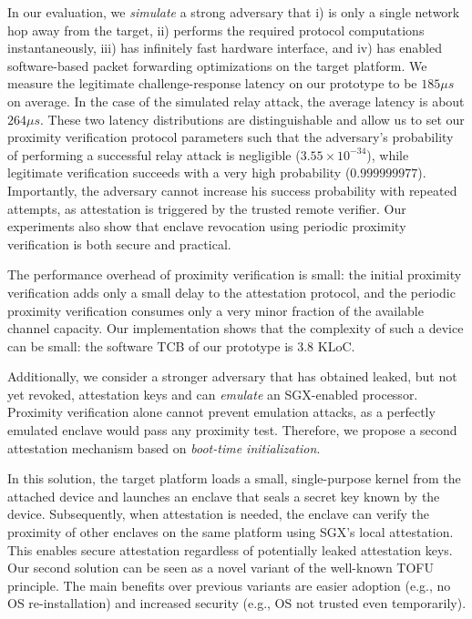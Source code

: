 In our evaluation, we \emph{simulate} a strong adversary that i) is only a single network hop away from the target, ii) performs the required protocol computations instantaneously, iii) has infinitely fast hardware interface, and iv) has enabled software-based packet forwarding optimizations on the target platform. We measure the legitimate challenge-response latency on our prototype to be $185 \mu s$ on average. In the case of the simulated relay attack, the average latency is about $264 \mu s$. These two latency distributions are distinguishable and allow us to set our proximity verification protocol parameters such that the adversary's probability of performing a successful relay attack is negligible ($3.55\times 10^{-34}$), while legitimate verification succeeds with a very high probability ($0.999999977$). Importantly, the adversary cannot increase his success probability with repeated attempts, as attestation is triggered by the trusted remote verifier. Our experiments also show that enclave revocation using periodic proximity verification is both secure and practical.


The performance overhead of proximity verification is small: the initial
proximity verification adds only a small delay to the attestation protocol, and
the periodic proximity verification consumes only a very minor fraction of
the available  channel capacity. Our implementation shows that the complexity of such a device can be small: the software TCB of our prototype is 3.8 KLoC.


 Additionally, we consider a stronger adversary that has obtained leaked, but not yet revoked, attestation keys and can \emph{emulate} an SGX-enabled processor.
%
Proximity verification alone cannot prevent emulation attacks, as a perfectly emulated enclave would pass any proximity test. Therefore, we propose a second attestation mechanism based on \emph{boot-time initialization}. 

In this solution, the target platform loads a small, single-purpose kernel from the attached device and launches an enclave that seals a secret key known by the device. 
Subsequently, when attestation is needed, the enclave can verify the proximity of other enclaves on the same platform using SGX's local attestation. This enables secure attestation regardless of potentially leaked attestation keys. Our second solution can be seen as a novel variant of the well-known TOFU principle. The main benefits over previous variants are easier adoption (e.g., no OS re-installation) and increased security (e.g., OS not trusted even temporarily).


